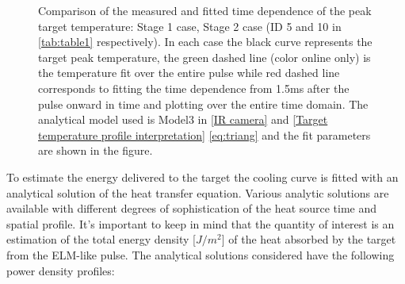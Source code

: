 \begin{figure}[!ht]
\begin{subfigure}{0.45\linewidth}
         \vspace{-20mm}
         \caption{\phantom{wewwwwwwwwwww}}
         \label{fig:IR1b}
     \end{subfigure}
        \caption{Comparison of the measured and fitted time dependence of the peak target temperature:  Stage 1 case,   Stage 2 case (ID 5 and 10 in \autoref{tab:table1} respectively). In each case the black curve represents the target peak temperature, the green dashed line (color online only) is the temperature fit over the entire pulse while red dashed line corresponds to fitting the time dependence from 1.5ms after the pulse onward in time and plotting over the entire time domain. The analytical model used is Model3 in \autoref{IR camera} and \autoref{Target temperature profile interpretation} \autoref{eq:triang} and the fit parameters are shown in the figure.}
        \label{fig:IR1}
\end{figure}

To estimate the energy delivered to the target the cooling curve is fitted with an analytical solution of the heat transfer equation. Various analytic solutions are available with different degrees of sophistication of the heat source time and spatial profile. It’s important to keep in mind that the quantity of interest is an estimation of the total energy density [$J/m^2$] of the heat absorbed by the target from the ELM-like pulse. The analytical solutions considered have the following power density profiles:

